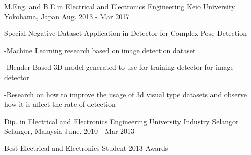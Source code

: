 

\begin{cventries}

  \cventry
    {M.Eng. and B.E in Electrical and Electronics Engineering} %
    {Keio University} %
    {Yokohama, Japan} %
    {Aug. 2013 - Mar 2017} %
    {
      \begin{cvitems} %
        \item {Special Negative Dataset Application in Detector for Complex Pose Detection}
        \item {-Machine Learning research based on image detection dataset}
        \item {-Blender Based 3D model generated to use for training detector for image detector }
        \item {-Research on how to improve the usage of 3d visual type datasets and observe how it is affect the rate of detection}
      \end{cvitems}
    }

  \cventry
    {Dip. in Electrical and Electronics Engineering} %
    {University Industry Selangor} %
    {Selangor, Malaysia} %
    {June. 2010 - Mar 2013} %
    {
      \begin{cvitems} %
        \item {Best Electrical and Electronics Student 2013 Awards}
      \end{cvitems}
    }

\end{cventries}

